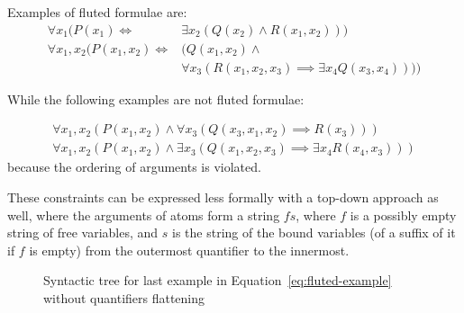 
Examples of fluted formulae are:
\begin{equation}\label{eq:fluted-example}
  \begin{aligned}
    \forall x_1 (P(x_1) \iff &\exists x_2(Q(x_2) \land R(x_1, x_2)))\\
    \forall x_1,x_2 (P(x_1,x_2) \iff &  (Q(x_1,x_2) \land\\
                                     &  \forall x_3 (R(x_1,x_2,x_3) \implies \exists x_4 Q(x_3,x_4))))
  \end{aligned}
\end{equation}

While the following examples are not fluted formulae:

\begin{equation}\label{eq:not-fluted-example}
  \begin{aligned}
    \forall x_1,x_2(P(x_1,x_2) \land \forall x_3(Q(x_3,x_1,x_2) \implies R(x_3)))\\
    \forall x_1,x_2(P(x_1,x_2) \land \exists x_3(Q(x_1,x_2,x_3) \implies \exists x_4 R(x_4,x_3)))
  \end{aligned}
\end{equation}
\indent because the ordering of arguments is violated.

\noindent These constraints can be expressed less formally with a top-down approach as well, where the arguments of atoms form a string \(fs\), where \(f\) is a possibly empty string of free variables, and \(s\) is the string of the bound variables (of a suffix of it if \(f\) is empty) from the outermost quantifier to the innermost.

\begin{figure}[H]
    \centering
    \caption{Syntactic tree for last example in Equation~\ref{eq:fluted-example} without quantifiers flattening}\label{fig:fluted_syntree}
\end{figure}

